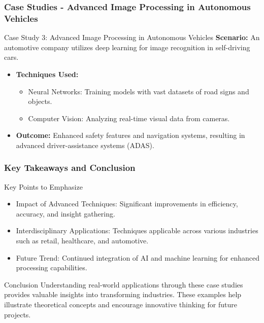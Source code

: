 \documentclass[aspectratio=169]{beamer}
\begin{document}
\begin{frame}[fragile]
    \frametitle{Case Studies - Advanced Image Processing in Autonomous Vehicles}
    \begin{block}{Case Study 3: Advanced Image Processing in Autonomous Vehicles}
        \textbf{Scenario:} An automotive company utilizes deep learning for image recognition in self-driving cars.
        \begin{itemize}
            \item \textbf{Techniques Used:}
            \begin{itemize}
                \item Neural Networks: Training models with vast datasets of road signs and objects.
                \item Computer Vision: Analyzing real-time visual data from cameras.
            \end{itemize}
            \item \textbf{Outcome:} Enhanced safety features and navigation systems, resulting in advanced driver-assistance systems (ADAS).
        \end{itemize}
    \end{block}
\end{frame}

\begin{frame}[fragile]
    \frametitle{Key Takeaways and Conclusion}
    \begin{block}{Key Points to Emphasize}
        \begin{itemize}
            \item Impact of Advanced Techniques: Significant improvements in efficiency, accuracy, and insight gathering.
            \item Interdisciplinary Applications: Techniques applicable across various industries such as retail, healthcare, and automotive.
            \item Future Trend: Continued integration of AI and machine learning for enhanced processing capabilities.
        \end{itemize}
    \end{block}
    
    \begin{block}{Conclusion}
        Understanding real-world applications through these case studies provides valuable insights into transforming industries. These examples help illustrate theoretical concepts and encourage innovative thinking for future projects.
    \end{block}
\end{frame}
\end{document}
